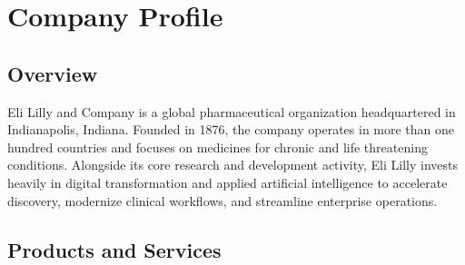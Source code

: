 \documentclass[12pt, a4paper, oneside]{report}
\begin{document}
\newpage

%
%

\tableofcontents
\newpage

\listoffigures
{}
\newpage

\listoftables
{}
\newpage

\setcounter{page}{1}

\chapter{Company Profile}

\section{Overview}

Eli Lilly and Company is a global pharmaceutical organization headquartered in Indianapolis, Indiana. Founded in 1876, the company operates in more than one hundred countries and focuses on medicines for chronic and life threatening conditions. Alongside its core research and development activity, Eli Lilly invests heavily in digital transformation and applied artificial intelligence to accelerate discovery, modernize clinical workflows, and streamline enterprise operations.

\section{Products and Services}
\end{document}

